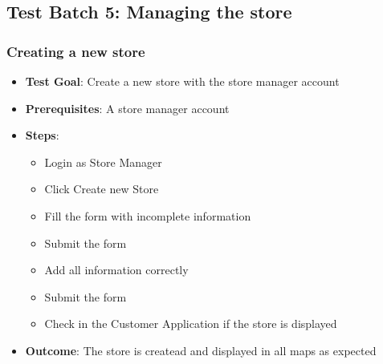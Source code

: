 \subsection{Test Batch 5: Managing the store}
\subsubsection{Creating a new store}
\begin{itemize}
    \item \textbf{Test Goal}: Create a new store with the store manager account
    \item \textbf{Prerequisites}: A store manager account
    \item \textbf{Steps}:
    \begin{itemize}
        \item Login as Store Manager
        \item Click Create new Store
        \item Fill the form with incomplete information
        \item Submit the form
        \item Add all information correctly
        \item Submit the form
        \item Check in the Customer Application if the store is displayed
    \end{itemize}
    \item \textbf{Outcome}: The store is createad and displayed in all maps as expected
\end{itemize} 
